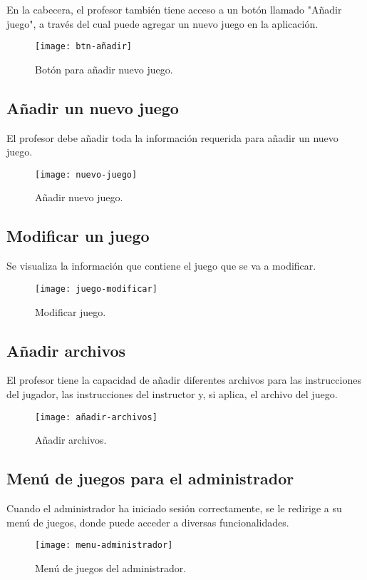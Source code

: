 En la cabecera, el profesor también tiene acceso a un botón llamado "Añadir juego", a través del cual puede agregar un nuevo juego en la aplicación.

\begin{figure}[htb]
\centering
\texttt{[image: btn-añadir]}
\caption{Botón para añadir nuevo juego.}
\label{fig:btn-añadir}
\end{figure}

\subsection{Añadir un nuevo juego}
El profesor debe añadir toda la información requerida para añadir un nuevo juego.

\begin{figure}[htb]
\centering
\texttt{[image: nuevo-juego]}
\caption{Añadir nuevo juego.}
\label{fig:nuevo-juego}
\end{figure}
\newpage
\subsection{Modificar un juego}
Se visualiza la información que contiene el juego que se va a modificar.
\begin{figure}[htb]
\centering
\texttt{[image: juego-modificar]}
\caption{Modificar juego.}
\label{fig:juego-modificar}
\end{figure}
\newpage

\subsection{Añadir archivos}
El profesor tiene la capacidad de añadir diferentes archivos para las instrucciones del jugador, las instrucciones del instructor y, si aplica, el archivo del juego.
\begin{figure}[htb]
\centering
\texttt{[image: añadir-archivos]}
\caption{Añadir archivos.}
\label{fig:añadir-archivos}
\end{figure}

\subsection{Menú de juegos para el administrador}
Cuando el administrador ha iniciado sesión correctamente, se le redirige a su menú de juegos, donde puede acceder a diversas funcionalidades.
\begin{figure}[htb]
\centering
\texttt{[image: menu-administrador]}
\caption{Menú de juegos del administrador.}
\label{fig:menu-administrador}
\end{figure}

